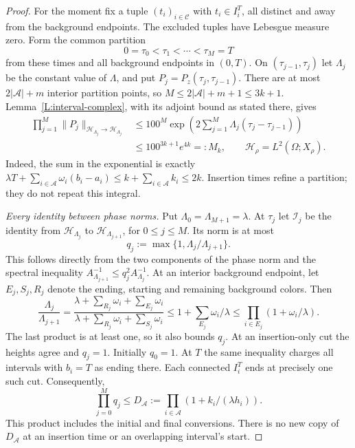 \documentclass[12pt]{article}
\numberwithin{equation}{section}
\theoremstyle{definition}
\begin{document}
\begin{proof}
  For the moment fix a tuple $(t_i)_{i\in\mathcal C}$ with
  $t_i\in I_i^T$, all distinct and away from the background endpoints.
  The excluded tuples have Lebesgue measure zero. Form the common
  partition
  \begin{equation}\label{E:split-partition}
    0=\tau_0<\tau_1<\cdots<\tau_M=T
  \end{equation}
  from these times and all background endpoints in $(0,T)$.
  On $(\tau_{j-1},\tau_j)$ let $\Lambda_j$ be the constant value of
  $\Lambda$, and put $P_j=P_z(\tau_j,\tau_{j-1})$.
  There are at most $2|\mathcal A|+m$ interior partition points, so
  $M\le2|\mathcal A|+m+1\le3k+1$.
  Lemma~\ref{L:interval-complex}, with its adjoint bound as stated there,
  gives
  \begin{equation}\label{E:split-segment-product}
    \begin{split}
      \prod_{j=1}^M\|P_j\|_{\mathcal H_{\Lambda_j}\to
      \mathcal H_{\Lambda_j}}
      &\le100^M\exp\left(2\sum_{j=1}^M
      \Lambda_j(\tau_j-\tau_{j-1})\right)\\
      &\le100^{3k+1}e^{4k}=:M_k,
      \qquad \mathcal H_\rho=L^2(\Omega;X_\rho).
    \end{split}
  \end{equation}
  Indeed, the sum in the exponential is exactly
  $\lambda T+\sum_{i\in\mathcal A}\omega_i(b_i-a_i)
  \le k+\sum_{i\in\mathcal A}k_i\le2k$.
  Insertion times refine a partition; they do not repeat this integral.

  \emph{Every identity between phase norms.}
  Put $\Lambda_0=\Lambda_{M+1}=\lambda$.
  At $\tau_j$ let $\mathscr I_j$ be the identity from
  $\mathcal H_{\Lambda_j}$ to $\mathcal H_{\Lambda_{j+1}}$,
  for $0\le j\le M$. Its norm is at most
  \[
    q_j:=\max\{1,\Lambda_j/\Lambda_{j+1}\}.
  \]
  This follows directly from the two components of the phase norm and
  the spectral inequality
  $A_{\Lambda_{j+1}}^{-1}\le q_j^2 A_{\Lambda_j}^{-1}$.
  At an interior background endpoint, let $E_j,S_j,R_j$ denote the
  ending, starting and remaining background colors. Then
  \[
    \frac{\Lambda_j}{\Lambda_{j+1}}
    =\frac{\lambda+\sum_{R_j}\omega_i+\sum_{E_j}\omega_i}
    {\lambda+\sum_{R_j}\omega_i+\sum_{S_j}\omega_i}
    \le1+\sum_{E_j}\omega_i/\lambda
    \le\prod_{i\in E_j}(1+\omega_i/\lambda).
  \]
  The last product is at least one, so it also bounds $q_j$.
  At an insertion-only cut the heights agree and $q_j=1$.
  Initially $q_0=1$. At $T$ the same inequality charges all intervals
  with $b_i=T$ as ending there. Each connected $I_i^T$ ends at precisely
  one such cut. Consequently,
  \begin{equation}\label{E:interval-copy-metric}
    \prod_{j=0}^M q_j
    \le D_{\mathcal A}:=
    \prod_{i\in\mathcal A}(1+k_i/(\lambda h_i)).
  \end{equation}
  This product includes the initial and final conversions. There is no
  new copy of $D_{\mathcal A}$ at an insertion time or an overlapping
  interval's start.


\end{proof}
\end{document}
